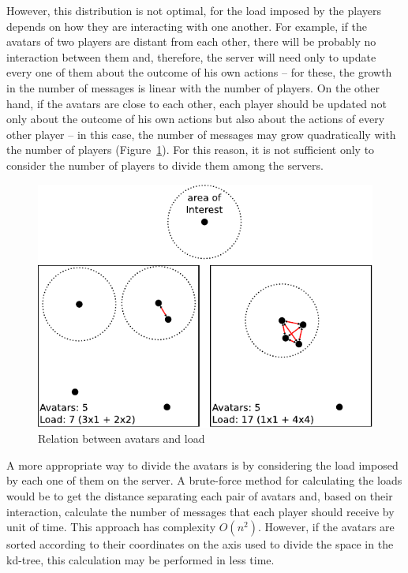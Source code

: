 However, this distribution is not optimal, for the load imposed by the players depends on how they are interacting with one another. For example, if the avatars of two players are distant from each other, there will be probably no interaction between them and, therefore, the server will need only to update every one of them about the outcome of his own actions -- for these, the growth in the number of messages is linear with the number of players. On the other hand, if the avatars are close to each other, each player should be updated not only about the outcome of his own actions but also about the actions of every other player -- in this case, the number of messages may grow quadratically with the number of players \mbox{(Figure \ref{fig:load})}. For this reason, it is not sufficient only to consider the number of players to divide them among the servers.

\begin{figure}
  \centering
  \includegraphics[width=0.8\linewidth]{images/carga}
  \caption{Relation between avatars and load}
  \label{fig:load}
\end{figure}

A more appropriate way to divide the avatars is by considering the load imposed by each one of them on the server. A brute-force method for calculating the loads would be to get the distance separating each pair of avatars and, based on their interaction, calculate the number of messages that each player should receive by unit of time. This approach has complexity $O(n^2)$. However, if the avatars are sorted according to their coordinates on the axis used to divide the space in the kd-tree, this calculation may be performed in less time.

